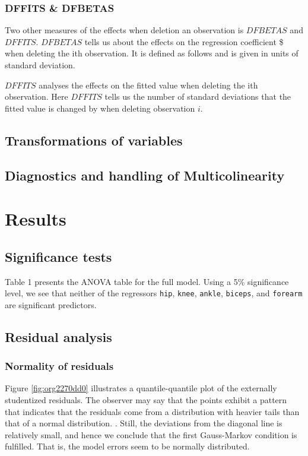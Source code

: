 \documentclass[11pt]{article}
\begin{document}
\subsubsection{DFFITS \& DFBETAS}
\label{sec:org7529b02}

Two other measures of the effects when deletion an observation is \(DFBETAS\) and \(DFFITS\). \(DFBETAS\) tells us
about the effects on the regression coefficient \$ when deleting the ith observation. It is defined as
follows and is given in units of standard deviation.

\(DFFITS\) analyses the effects on the fitted value when deleting the ith observation. Here \(DFFITS\) tells us
the number of standard deviations that the fitted value is changed by when deleting observation \(i\).

\subsection{Transformations of variables}
\label{sec:orgee2e73c}
\subsection{Diagnostics and handling of Multicolinearity}
\label{sec:org91a9288}
\newpage
\section{Results}
\label{sec:org36948d8}
\subsection{Significance tests}
\label{sec:orgc041025}

Table 1 presents the ANOVA table for the full model. Using a 5\% significance level, we see that neither of 
the regressors \texttt{hip}, \texttt{knee}, \texttt{ankle}, \texttt{biceps}, and \texttt{forearm} are 
significant predictors. 



\subsection{Residual analysis}
\label{sec:org4be9397}
\subsubsection{Normality of residuals}
\label{sec:org5d08c23}

Figure \ref{fig:org2270dd0} illustrates a quantile-quantile plot of the externally studentized residuals.
The observer may say that the  points exhibit a pattern that indicates that the residuals come from
a distribution with heavier tails than that of a normal distribution. 
\cite{Montgomery2012}. Still, the deviations from the diagonal line is relatively small, and hence
we conclude that the first Gauss-Markov condition is fulfilled. That is, the model errors seem to be 
normally distributed.
\end{document}
